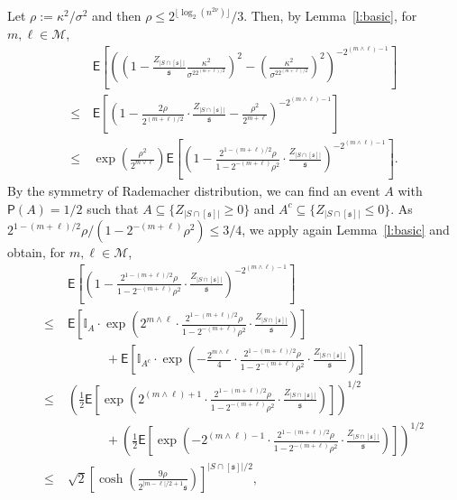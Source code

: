 \documentclass[11pt, a4paper]{article}
\newcommand{\mc}{\mathcal}
\renewcommand{\l}{\left}
\renewcommand{\r}{\right}
\newcommand{\E}[0]{\mathsf{E}}
\newcommand{\p}{\mathsf{P}}
\theoremstyle{definition}
\theoremstyle{definition}
\theoremstyle{definition}
\theoremstyle{definition}
\theoremstyle{definition}
\theoremstyle{remark}
\theoremstyle{definition}
\theoremstyle{definition}
\theoremstyle{definition}
\begin{document}
Let $\rho := \kappa^2 / \sigma^2$ and then %
$\rho \le 2^{\lfloor\log_2( n^{2\nu})\rfloor}/3$. Then, by Lemma~\ref{l:basic}, for $m,\ell\in\mc M$,
\begin{align*}
& \E\l[\l(\l(1-\frac{Z_{\vert S \cap [\mathfrak s]\vert}}{\mathfrak{s}}\frac{\kappa^2}{\sigma^22^{(m+\ell)/2}}\r)^2 - \l(\frac{\kappa^2}{\sigma^22^{(m+\ell)/2}}\r)^2\r)^{-2^{(m\wedge \ell) -1}}\r] \\
\le\, &\E\l[\l(1-\frac{2\rho}{2^{(m+\ell)/2}}\cdot\frac{Z_{\vert S \cap [\mathfrak s]\vert}}{\mathfrak{s}}- \frac{\rho^2}{2^{m+\ell}}\r)^{-2^{(m\wedge \ell) -1}}\r] \\
\le\, & \exp\l(\frac{\rho^2}{2^{m\vee \ell}}\r)\E\l[\l(1-\frac{2^{1-(m+\ell)/2}\rho}{1-2^{-(m+\ell)}\rho^2}\cdot\frac{ Z_{\vert S \cap [\mathfrak s]\vert}}{\mathfrak{s}}\r)^{-2^{(m\wedge \ell) -1}}\r].
\end{align*}
By the symmetry of Rademacher distribution, we can find an event $A$ with $\p(A) = 1/2$ such that $A \subseteq \{Z_{\vert S \cap [\mathfrak s]\vert} \ge 0\}$ and $A^c \subseteq \{Z_{\vert S \cap [\mathfrak s]\vert} \le 0\}$. As $2^{1-(m+\ell)/2}\rho/(1-2^{-(m+\ell)}\rho^2) \le 3/4$, we apply again Lemma~\ref{l:basic} and obtain, for $m,\ell\in\mc M$,
\begin{align*}
&\E\l[\l(1-\frac{2^{1-(m+\ell)/2}\rho}{1-2^{-(m+\ell)}\rho^2}\cdot\frac{ Z_{\vert S \cap [\mathfrak s]\vert}}{\mathfrak{s}}\r)^{-2^{(m\wedge \ell) -1}}\r] \\ 
\le \; &  \E\l[\mathbb{I}_{A}\cdot\exp\l( 2^{m\wedge \ell} \cdot \frac{2^{1-(m+\ell)/2}\rho}{1-2^{-(m+\ell)}\rho^2}\cdot\frac{Z_{\vert S \cap [\mathfrak s]\vert}}{\mathfrak{s}}\r)\r] \\
&\qquad\quad+  \E\l[\mathbb{I}_{A^c}\cdot\exp\l( -\frac{ 2^{m\wedge \ell} }{4} \cdot \frac{2^{1-(m+\ell)/2}\rho}{1-2^{-(m+\ell)}\rho^2}\cdot\frac{Z_{\vert S \cap [\mathfrak s]\vert}}{\mathfrak{s}}\r)\r]\\
\le \; &   \l(\frac{1}{2} \E\l[\exp\l( 2^{(m\wedge \ell)+1}  \cdot \frac{2^{1-(m+\ell)/2}\rho}{1-2^{-(m+\ell)}\rho^2}\cdot\frac{Z_{\vert S \cap [\mathfrak s]\vert}}{\mathfrak{s}}\r)\r]\r)^{1/2} \\
& \qquad\quad + \l(\frac{1}{2} \E\l[\exp\l(-2^{(m\wedge \ell)-1} \cdot \frac{2^{1-(m+\ell)/2}\rho}{1-2^{-(m+\ell)}\rho^2}\cdot\frac{Z_{\vert S \cap [\mathfrak s]\vert}}{\mathfrak{s}}\r)\r]\r)^{1/2}\\
\le \; & \sqrt{2} \l[\cosh\l( \frac{9\rho  }{2^{\vert m-\ell\vert/2+1}\mathfrak{s}}\r)\r]^{\vert S \cap [\mathfrak s]\vert/2},
\end{align*}
\end{document}
